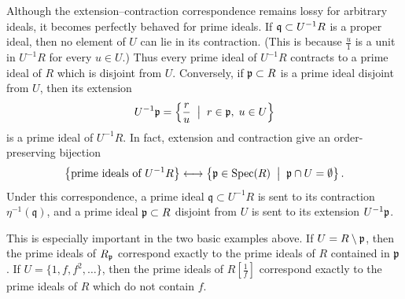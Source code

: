 \documentclass[12pt,reqno]{amsart}
\begin{document}
Although the extension--contraction correspondence remains lossy for arbitrary ideals, it becomes perfectly behaved for prime ideals. If $\mathfrak{q} \subset U^{-1}R$ is a proper ideal, then no element of $U$ can lie in its contraction. (This is because $\frac{u}{1}$ is a unit in $U^{-1}R$ for every $u\in U$.) Thus every prime ideal of $U^{-1}R$ contracts to a prime ideal of $R$ which is disjoint from $U$. Conversely, if $\mathfrak{p}\subset R$ is a prime ideal disjoint from $U$, then its extension
\[
U^{-1}\mathfrak{p}=\left\{\frac{r}{u}\;\; \big|\;\; r\in \mathfrak{p},\; u\in U\right\}
\]
is a prime ideal of $U^{-1}R$. In fact, extension and contraction give an order-preserving bijection
\[
\left\{\text{prime ideals of }U^{-1}R\right\}
\longleftrightarrow
\left\{\mathfrak{p}\in \operatorname{Spec}(R)\;\; \big|\;\; \mathfrak{p}\cap U=\emptyset\right\}.
\]
Under this correspondence, a prime ideal $\mathfrak{q}\subset U^{-1}R$ is sent to its contraction $\eta^{-1}(\mathfrak{q})$, and a prime ideal $\mathfrak{p}\subset R$ disjoint from $U$ is sent to its extension $U^{-1}\mathfrak{p}$.

This is especially important in the two basic examples above. If $U=R\setminus \mathfrak{p}$, then the prime ideals of $R_{\mathfrak{p}}$ correspond exactly to the prime ideals of $R$ contained in $\mathfrak{p}$. If $U=\{1,f,f^2,\ldots\}$, then the prime ideals of $R[\frac{1}{f}]$ correspond exactly to the prime ideals of $R$ which do not contain $f$.

\hrulefill
\end{document}
